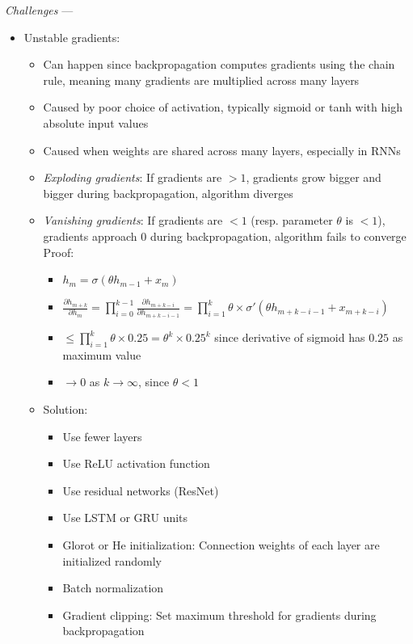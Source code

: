 \emph{Challenges} ---
\begin{itemize}
    \item Unstable gradients:
    \begin{itemize}
        \item Can happen since backpropagation computes gradients using the chain rule, meaning many gradients are multiplied across many layers
        \item Caused by poor choice of activation, typically sigmoid or tanh with high absolute input values
        \item Caused when weights are shared across many layers, especially in RNNs
        \item \emph{Exploding gradients}: If gradients are $> 1$, gradients grow bigger and bigger during backpropagation, algorithm diverges
        \item \emph{Vanishing gradients}: If gradients are $< 1$ (resp. parameter $\theta$ is $< 1$), gradients approach $0$ during backpropagation, algorithm fails to converge\\
        Proof:
        \begin{itemize}
            \item $h_m = \sigma(\theta h_{m-1} + x_m)$
            \item $ \frac{\partial h_{m+k}}{\partial h_m}  = \prod_{i=0}^{k-1}  \frac{\partial h_{m+k-i}}{\partial h_{m+k-i-1}} = \prod_{i=1}^{k}  \theta \times \sigma'(\theta h_{m+k-i-1} + x_{m+k-i}) $ 
            \item $\leq \prod_{i=1}^{k}  \theta \times 0.25 = \theta ^k \times 0.25^k$ since derivative of sigmoid has $0.25$ as maximum value
            \item $\to 0$ as $k \to \infty$, since $ \theta  < 1$
        \end{itemize}
        \item Solution:
        \begin{itemize}
            \item Use fewer layers
            \item Use ReLU activation function
            \item Use residual networks (ResNet)
            \item Use LSTM or GRU units
            \item Glorot or He initialization: Connection weights of each layer are initialized randomly
            \item Batch normalization
            \item Gradient clipping: Set maximum threshold for gradients during backpropagation

\end{itemize}
\end{itemize}
\end{itemize}
